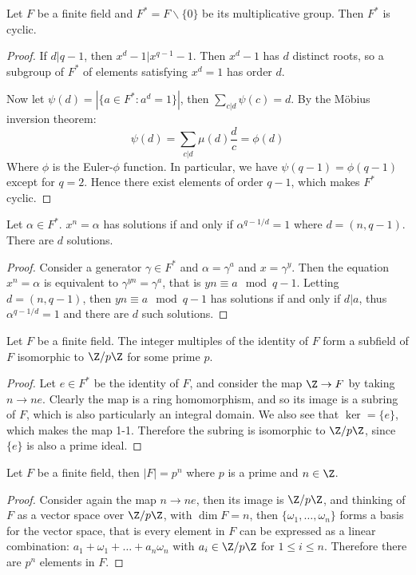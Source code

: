 \begin{theorem}\label{theorem7.1.2}
    Let $F$ be a finite field and $F^*=F\backslash\{0\}$ be its multiplicative group. Then $F^*$ is cyclic. 
\end{theorem}
\begin{proof}
    If $d|q-1$, then $x^d-1|x^{q-1}-1$. Then $x^d-1$ has $d$ distinct roots, so a subgroup of $F^*$ of elements satisfying $x^d=1$ has order $d$.
    
    Now let $\psi(d)=|\{a \in F^*:a^d=1\}|$, then $\sum_{c|d} \psi(c)=d$. By the Möbius inversion theorem:
        \begin{equation*}
            \psi(d) = \sum_{c|d} \mu(d)\frac{d}{c}=\phi(d)
        \end{equation*}
    Where $\phi$ is the Euler-$\phi$ function. In particular, we have $\psi(q-1)=\phi(q-1)$ except for $q=2$. Hence there exist elements of order $q-1$, which makes $F^*$ cyclic. 
\end{proof}

\begin{proposition}
    Let $\alpha \in F^*$. $x^n=\alpha$ has solutions if and only if $\alpha^{q-1/d}=1$ where $d=(n,q-1)$. There are $d$ solutions.
\end{proposition}
\begin{proof}
    Consider a generator $\gamma \in F^*$ and $\alpha=\gamma^a$ and $x= \gamma^y$. Then the equation $x^n=\alpha$ is equivalent to $\gamma^{yn}=\gamma^a$, that is $yn \equiv a \mod{q-1}$. Letting $d=(n,q-1)$, then $yn \equiv a \mod{q-1}$ has solutions if and only if $d|a$, thus $\alpha^{q-1/d}=1$ and there are $d$ such solutions.
\end{proof}

\begin{lemma}
    Let $F$ be a finite field. The integer multiples of the identity of $F$ form a subfield of $F$ isomorphic to $\Z/p\Z$ for some prime $p$.
\end{lemma}
\begin{proof}
    Let $e \in F^*$ be the identity of $F$, and consider the map $\Z \rightarrow F$ by taking $n \rightarrow ne$. Clearly the map is a ring homomorphism, and so its image is a subring of $F$, which is also particularly an integral domain. We also see that $\ker=\{e\}$, which makes the map 1-1. Therefore the subring is isomorphic to $\Z/p\Z$, since $\{e\}$ is also a prime ideal.
\end{proof}

\begin{proposition}
    Let $F$ be a finite field, then $|F|=p^n$ where $p$ is a prime and $n \in \Z$.
\end{proposition}
\begin{proof}
    Consider again the map $n \rightarrow ne$, then its image is $\Z/p\Z$, and thinking of $F$ as a vector space over $\Z/p\Z$, with $\dim{F}=n$, then $\{\omega_1, \dots, \omega_n\}$ forms a basis for the vector space, that is every element in $F$ can be expressed as a linear combination: $a_1+\omega_1+ \dots +a_n \omega_n$ with $a_i \in \Z/p\Z$ for $1 \leq i \leq n$. Therefore there are $p^n$ elements in $F$.
\end{proof}